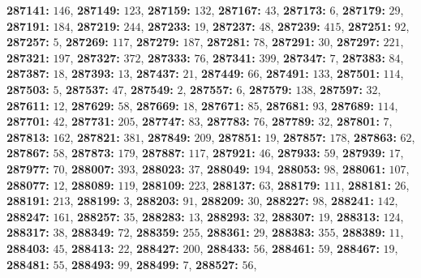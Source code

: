 \textsf{\bfseries 287141:} $146$, \textsf{\bfseries 287149:} $123$, \textsf{\bfseries 287159:} $132$, \textsf{\bfseries 287167:} $43$, \textsf{\bfseries 287173:} $6$, \textsf{\bfseries 287179:} $29$, \textsf{\bfseries 287191:} $184$, \textsf{\bfseries 287219:} $244$, \textsf{\bfseries 287233:} $19$, \textsf{\bfseries 287237:} $48$, \textsf{\bfseries 287239:} $415$, \textsf{\bfseries 287251:} $92$, \textsf{\bfseries 287257:} $5$, \textsf{\bfseries 287269:} $117$, \textsf{\bfseries 287279:} $187$, \textsf{\bfseries 287281:} $78$, \textsf{\bfseries 287291:} $30$, \textsf{\bfseries 287297:} $221$, \textsf{\bfseries 287321:} $197$, \textsf{\bfseries 287327:} $372$, \textsf{\bfseries 287333:} $76$, \textsf{\bfseries 287341:} $399$, \textsf{\bfseries 287347:} $7$, \textsf{\bfseries 287383:} $84$, \textsf{\bfseries 287387:} $18$, \textsf{\bfseries 287393:} $13$, \textsf{\bfseries 287437:} $21$, \textsf{\bfseries 287449:} $66$, \textsf{\bfseries 287491:} $133$, \textsf{\bfseries 287501:} $114$, \textsf{\bfseries 287503:} $5$, \textsf{\bfseries 287537:} $47$, \textsf{\bfseries 287549:} $2$, \textsf{\bfseries 287557:} $6$, \textsf{\bfseries 287579:} $138$, \textsf{\bfseries 287597:} $32$, \textsf{\bfseries 287611:} $12$, \textsf{\bfseries 287629:} $58$, \textsf{\bfseries 287669:} $18$, \textsf{\bfseries 287671:} $85$, \textsf{\bfseries 287681:} $93$, \textsf{\bfseries 287689:} $114$, \textsf{\bfseries 287701:} $42$, \textsf{\bfseries 287731:} $205$, \textsf{\bfseries 287747:} $83$, \textsf{\bfseries 287783:} $76$, \textsf{\bfseries 287789:} $32$, \textsf{\bfseries 287801:} $7$, \textsf{\bfseries 287813:} $162$, \textsf{\bfseries 287821:} $381$, \textsf{\bfseries 287849:} $209$, \textsf{\bfseries 287851:} $19$, \textsf{\bfseries 287857:} $178$, \textsf{\bfseries 287863:} $62$, \textsf{\bfseries 287867:} $58$, \textsf{\bfseries 287873:} $179$, \textsf{\bfseries 287887:} $117$, \textsf{\bfseries 287921:} $46$, \textsf{\bfseries 287933:} $59$, \textsf{\bfseries 287939:} $17$, \textsf{\bfseries 287977:} $70$, \textsf{\bfseries 288007:} $393$, \textsf{\bfseries 288023:} $37$, \textsf{\bfseries 288049:} $194$, \textsf{\bfseries 288053:} $98$, \textsf{\bfseries 288061:} $107$, \textsf{\bfseries 288077:} $12$, \textsf{\bfseries 288089:} $119$, \textsf{\bfseries 288109:} $223$, \textsf{\bfseries 288137:} $63$, \textsf{\bfseries 288179:} $111$, \textsf{\bfseries 288181:} $26$, \textsf{\bfseries 288191:} $213$, \textsf{\bfseries 288199:} $3$, \textsf{\bfseries 288203:} $91$, \textsf{\bfseries 288209:} $30$, \textsf{\bfseries 288227:} $98$, \textsf{\bfseries 288241:} $142$, \textsf{\bfseries 288247:} $161$, \textsf{\bfseries 288257:} $35$, \textsf{\bfseries 288283:} $13$, \textsf{\bfseries 288293:} $32$, \textsf{\bfseries 288307:} $19$, \textsf{\bfseries 288313:} $124$, \textsf{\bfseries 288317:} $38$, \textsf{\bfseries 288349:} $72$, \textsf{\bfseries 288359:} $255$, \textsf{\bfseries 288361:} $29$, \textsf{\bfseries 288383:} $355$, \textsf{\bfseries 288389:} $11$, \textsf{\bfseries 288403:} $45$, \textsf{\bfseries 288413:} $22$, \textsf{\bfseries 288427:} $200$, \textsf{\bfseries 288433:} $56$, \textsf{\bfseries 288461:} $59$, \textsf{\bfseries 288467:} $19$, \textsf{\bfseries 288481:} $55$, \textsf{\bfseries 288493:} $99$, \textsf{\bfseries 288499:} $7$, \textsf{\bfseries 288527:} $56$, 
